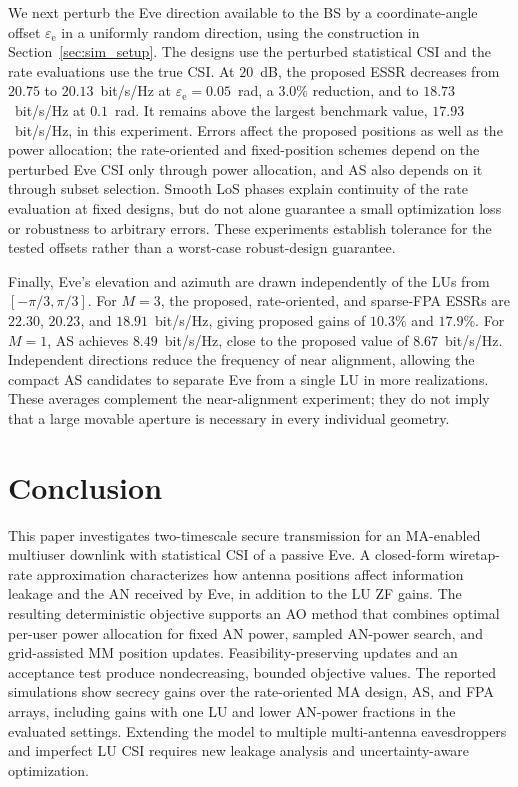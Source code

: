 \documentclass[journal]{IEEEtran}
\begin{document}
We next perturb the Eve direction available to the BS by a coordinate-angle offset $\varepsilon_{\mathrm e}$ in a uniformly random direction, using the construction in Section~\ref{sec:sim_setup}. The designs use the perturbed statistical CSI and the rate evaluations use the true CSI. At $20$~dB, the proposed ESSR decreases from $20.75$ to $20.13$~bit/s/Hz at $\varepsilon_{\mathrm e}=0.05$~rad, a $3.0\%$ reduction, and to $18.73$~bit/s/Hz at $0.1$~rad. It remains above the largest benchmark value, $17.93$~bit/s/Hz, in this experiment. Errors affect the proposed positions as well as the power allocation; the rate-oriented and fixed-position schemes depend on the perturbed Eve CSI only through power allocation, and AS also depends on it through subset selection. Smooth LoS phases explain continuity of the rate evaluation at fixed designs, but do not alone guarantee a small optimization loss or robustness to arbitrary errors. These experiments establish tolerance for the tested offsets rather than a worst-case robust-design guarantee.

{
Finally, Eve's elevation and azimuth are drawn independently of the LUs from $[-\pi/3,\pi/3]$. For $M=3$, the proposed, rate-oriented, and sparse-FPA ESSRs are $22.30$, $20.23$, and $18.91$~bit/s/Hz, giving proposed gains of $10.3\%$ and $17.9\%$. For $M=1$, AS achieves $8.49$~bit/s/Hz, close to the proposed value of $8.67$~bit/s/Hz. Independent directions reduce the frequency of near alignment, allowing the compact AS candidates to separate Eve from a single LU in more realizations. These averages complement the near-alignment experiment; they do not imply that a large movable aperture is necessary in every individual geometry.\par}


\section{Conclusion}\label{sec:conclusion}
This paper investigates two-timescale secure transmission for an MA-enabled multiuser downlink with statistical CSI of a passive Eve. A closed-form wiretap-rate approximation characterizes how antenna positions affect information leakage and the AN received by Eve, in addition to the LU ZF gains. The resulting deterministic objective supports an AO method that combines optimal per-user power allocation for fixed AN power, sampled AN-power search, and grid-assisted MM position updates. Feasibility-preserving updates and an acceptance test produce nondecreasing, bounded objective values. The reported simulations show secrecy gains over the rate-oriented MA design, AS, and FPA arrays, including gains with one LU and lower AN-power fractions in the evaluated settings. Extending the model to multiple multi-antenna eavesdroppers and imperfect LU CSI requires new leakage analysis and uncertainty-aware optimization.
\end{document}
